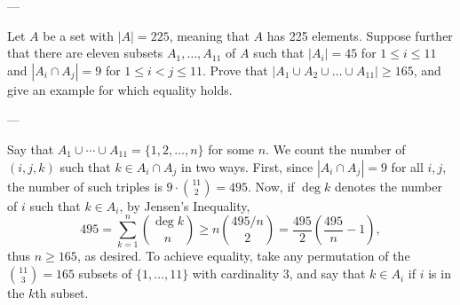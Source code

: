 
---

Let $A$ be a set with $|A|=225$, meaning that $A$ has 225 elements. Suppose further that there are eleven subsets $A_1, \ldots, A_{11}$ of $A$ such that $|A_i|=45$ for $1\le i\le11$ and $|A_i\cap A_j|=9$ for $1\le i<j\le11$. Prove that $|A_1\cup A_2\cup\ldots\cup A_{11}|\ge165$, and give an example for which equality holds.

---

Say that $A_1\cup\cdots\cup A_{11}=\{1,2,\ldots,n\}$ for some $n$. We count the number of $(i,j,k)$ such that $k\in A_i\cap A_j$ in two ways. First, since $|A_i\cap A_j|=9$ for all $i,j$, the number of such triples is $9\cdot\binom{11}2=495$. Now, if $\deg k$ denotes the number of $i$ such that $k\in A_i$, by Jensen's Inequality, \[495=\sum_{k=1}^n\binom{\deg k}n\ge n\binom{495/n}2=\frac{495}2\left(\frac{495}n-1\right),\]
thus $n\ge165$, as desired. To achieve equality, take any permutation of the $\binom{11}3=165$ subsets of $\{1,\ldots,11\}$ with cardinality $3$, and say that $k\in A_i$ if $i$ is in the $k$th subset.
